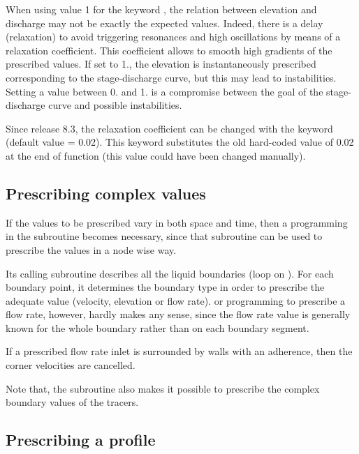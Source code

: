 When using value 1 for the keyword , the relation
between elevation and discharge may not be exactly the expected values.
Indeed, there is a delay (relaxation) to avoid triggering resonances and
high oscillations by means of a relaxation coefficient.
This coefficient allows to smooth high gradients of the prescribed values.
If set to 1., the elevation is instantaneously prescribed corresponding to the
stage-discharge curve, but this may lead to instabilities.
Setting a value between 0. and 1. is a compromise between the goal of the
stage-discharge curve and possible instabilities.

Since release 8.3, the relaxation coefficient can be changed with the keyword
 (default value = 0.02).
This keyword substitutes the old hard-coded value of 0.02 at the end of function
 (this value could have been changed manually).

\subsection{Prescribing complex values}

If the values to be prescribed vary in both space and time, then a programming
in the  subroutine becomes necessary,
since that subroutine can be used to prescribe the values in a node wise way.

Its calling subroutine  describes all the liquid boundaries
(loop on ).
For each boundary point, it determines the boundary type in order to prescribe
the adequate value (velocity, elevation or flow rate).
 or  programming to prescribe a flow rate,
however, hardly makes any sense, since the flow rate value is generally known
for the whole boundary rather than on each boundary segment.

If a prescribed flow rate inlet is surrounded by walls with an adherence, then
the corner velocities are cancelled.

Note that, the  subroutine also makes it possible
to prescribe the complex boundary values of the tracers.

\subsection{Prescribing a profile}



